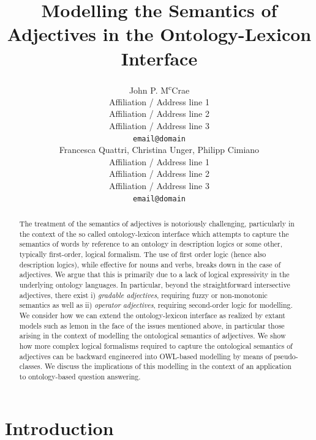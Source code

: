 \documentclass[11pt]{article}
\title{Modelling the Semantics of Adjectives in the Ontology-Lexicon Interface}
\author{John P. M\textsuperscript{c}Crae \\
  Affiliation / Address line 1 \\
  Affiliation / Address line 2 \\
  Affiliation / Address line 3 \\
  {\tt email@domain} \\\And
  Francesca Quattri, Christina Unger, Philipp Cimiano \\
  Affiliation / Address line 1 \\
  Affiliation / Address line 2 \\
  Affiliation / Address line 3 \\
  {\tt email@domain} \\}
\date{}
\begin{document}
\maketitle
\begin{abstract}
The treatment of the semantics of adjectives is notoriously challenging, particularly in the context of the so called ontology-lexicon interface which attempts to capture the semantics of words by reference to an ontology in description logics or some other, typically first-order, logical formalism.
The use of first order logic (hence also description logics),
while effective for nouns and verbs, breaks down in the case of adjectives. 
We argue that this is primarily due to a lack of logical expressivity in the 
underlying ontology languages. In particular, beyond the straightforward intersective adjectives, there exist i) \emph{gradable adjectives}, requiring fuzzy or
non-monotonic semantics as well as ii) \emph{operator adjectives}, requiring second-order logic for modelling. 
We consider how we can extend the ontology-lexicon interface as realized by extant models such as lemon in the face of the issues mentioned above, in particular those arising in the context of modelling the ontological semantics of adjectives. We show how more complex logical formalisms required to capture the ontological semantics of adjectives can be backward 
engineered into OWL-based modelling by means of pseudo-classes. We discuss the implications of this modelling in the context of an application to ontology-based question answering.
\end{abstract}



\section{Introduction}
\label{intro}
\end{document}

